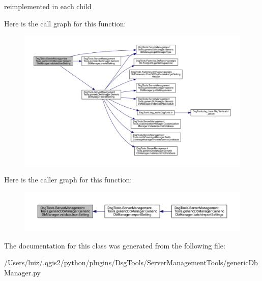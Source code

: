 \begin{DoxyVerb}reimplemented in each child
\end{DoxyVerb}
 Here is the call graph for this function\+:
\nopagebreak
\begin{figure}[H]
\begin{center}
\leavevmode
\includegraphics[width=350pt]{class_dsg_tools_1_1_server_management_tools_1_1generic_db_manager_1_1_generic_db_manager_ae93ce4976f6b22c9f1b4f5ee7d073514_cgraph}
\end{center}
\end{figure}
Here is the caller graph for this function\+:
\nopagebreak
\begin{figure}[H]
\begin{center}
\leavevmode
\includegraphics[width=350pt]{class_dsg_tools_1_1_server_management_tools_1_1generic_db_manager_1_1_generic_db_manager_ae93ce4976f6b22c9f1b4f5ee7d073514_icgraph}
\end{center}
\end{figure}


The documentation for this class was generated from the following file\+:\begin{DoxyCompactItemize}
\item 
/\+Users/luiz/.\+qgis2/python/plugins/\+Dsg\+Tools/\+Server\+Management\+Tools/generic\+Db\+Manager.\+py\end{DoxyCompactItemize}

